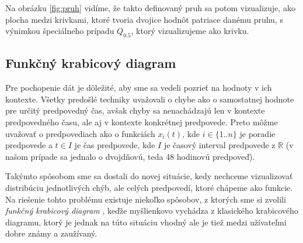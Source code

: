 Na obrázku \ref{fig:pruh} vidíme, že takto definovaný pruh sa potom vizualizuje, ako plocha medzi krivkami, ktoré tvoria dvojice hodnôt patriace danému pruhu, s výnimkou špeciálneho prípadu $ Q_{0.5} $, ktorý vizualizujeme ako krivku.





\subsection{Funkčný krabicový diagram}
Pre pochopenie dát je dôležité, aby sme sa vedeli pozrieť na hodnoty v ich kontexte. Všetky predošlé techniky uvažovali o chybe ako o samostatnej hodnote pre určitý predpovedný čas, avšak chyby sa nenachádzajú len v kontexte predpovedného času, ale aj v kontexte konkrétnej predpovede. Preto môžme uvažovať o predpovediach ako o funkciách $ x_{i}(t) $, kde $ i \in \{1..n\}$ je poradie predpovede a $ t \in I $ je čas predpovede, kde $ I $ je časový interval predpovede z $ \mathbb{R} $ (v našom prípade sa jednalo o dvojdňovú, teda 48 hodinovú predpoveď).

Takýmto spôsobom sme sa dostali do novej situácie, kedy nechceme vizualizovať distribúciu jednotlivých chýb, ale celých predpovedí, ktoré chápeme ako funkcie. Na riešenie tohto problému existuje niekoľko spôsobov, z ktorých sme si zvolili \textit{funkčný krabicový diagram} \cite{FunctionalBoxplot}, keďže myšlienkovo vychádza z klasického krabicového diagramu, ktorý je jednak na túto situáciu vhodný ale je tiež medzi užívateľmi dobre známy a zaužívaný.

